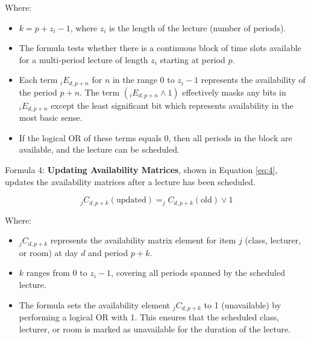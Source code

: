 Where:
\begin{itemize}
    \item \( k = p + z_i - 1 \), where \( z_i \) is the length of the lecture (number of periods).
    \item The formula tests whether there is a continuous block of time slots available for a multi-period lecture of length \( z_i \) starting at period \( p \).
    \item  Each term \( _iE_{d,p+n} \) for \( n \) in the range \( 0 \) to \( z_i-1 \) represents the availability of the period \( p+n \).  The term \(  (_iE_{d,p+n} \wedge 1)  \) effectively masks any bits in  \( _iE_{d,p+n} \) except the least significant bit which represents availability in the most basic sense.
    \item If the logical OR of these terms equals 0, then all periods in the block are available, and the lecture can be scheduled.
\end{itemize}

Formula 4: \textbf{Updating Availability Matrices}, shown in Equation \ref{eq:4}, updates the availability matrices after a lecture has been scheduled.

\begin{equation}
\label{eq:4}
_jC_{d, p+k} (\text{updated}) = _jC_{d, p+k} (\text{old}) \vee 1
\end{equation}

Where:
\begin{itemize}
    \item \( _jC_{d, p+k} \) represents the availability matrix element for item \( j \) (class, lecturer, or room) at day \( d \) and period \( p+k \).
    \item \( k \) ranges from 0 to \( z_i - 1 \), covering all periods spanned by the scheduled lecture.
    \item The formula sets the availability element \( _jC_{d, p+k} \) to 1 (unavailable) by performing a logical OR with 1.
This ensures that the scheduled class, lecturer, or room is marked as unavailable for the duration of the lecture.
\end{itemize}
